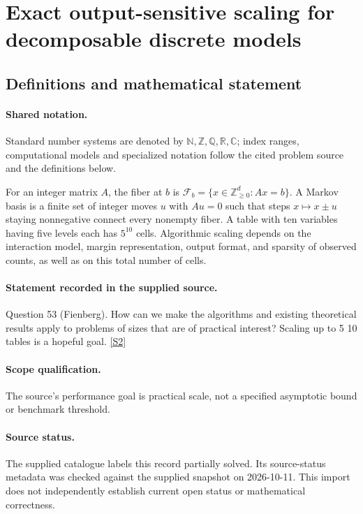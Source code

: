 \documentclass[11pt]{article}
\newcommand{\sref}[2]{\hyperlink{source:#1:#2}{[S#2]}}
\begin{document}
\section{Exact output-sensitive scaling for decomposable discrete models}\label{statement}

\subsection{Definitions and mathematical statement}

\paragraph{Shared notation.}Standard number systems are denoted by $\mathbb N,\mathbb Z,\mathbb Q,\mathbb R,\mathbb C$; index ranges, computational models and specialized notation follow the cited problem source and the definitions below.


For an integer matrix $A$, the fiber at $b$ is $\mathcal F_b=\{x\in\mathbb Z_{\ge0}^d:Ax=b\}$. A Markov basis is a finite set of integer moves $u$ with $Au=0$ such that steps $x\mapsto x\pm u$ staying nonnegative connect every nonempty fiber. A table with ten variables having five levels each has $5^{10}$ cells. Algorithmic scaling depends on the interaction model, margin representation, output format, and sparsity of observed counts, as well as on this total number of cells.
\paragraph{Statement recorded in the supplied source.}
Question 53 (Fienberg). How can we make the algorithms and existing theoretical results apply to problems of sizes that are of practical interest? Scaling up to 5 10 tables is a hopeful goal. \sref{statement}{2}
\paragraph{Scope qualification.}
The source's performance goal is practical scale, not a specified asymptotic bound or benchmark threshold.
\paragraph{Source status.}
The supplied catalogue labels this record partially solved. Its source-status metadata was checked against the supplied snapshot on 2026-10-11. This import does not independently establish current open status or mathematical correctness.
\end{document}
